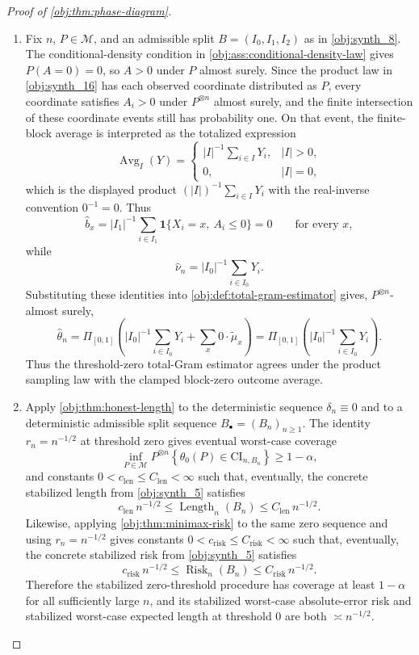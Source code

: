\begin{proof}[Proof of \cref{obj:thm:phase-diagram}]
\begin{enumerate}
\item Fix \(n\), \(P\in\mathcal M\), and an admissible split \(B=(I_0,I_1,I_2)\)
as in \cref{obj:synth_8}.  The conditional-density condition in
\cref{obj:ass:conditional-density-law} gives \(P(A=0)=0\), so \(A>0\) under \(P\)
almost surely.  Since the product law in
\cref{obj:synth_16} has each observed coordinate distributed as \(P\), every
coordinate satisfies \(A_i>0\) under \(P^{\otimes n}\) almost surely, and the
finite intersection of these coordinate events still has probability one.  On
that event, the finite-block average is interpreted as the totalized expression
\[
\operatorname{Avg}_I(Y)
=
\begin{cases}
|I|^{-1}\sum_{i\in I}Y_i,& |I|>0,\\
0,& |I|=0,
\end{cases}
\]
which is the displayed product \((|I|)^{-1}\sum_{i\in I}Y_i\) with the
real-inverse convention \(0^{-1}=0\).  Thus
\[
\widehat b_x
=
|I_1|^{-1}\sum_{i\in I_1}\mathbf 1\{X_i=x,\ A_i\le0\}
=
0
\qquad\text{for every }x,
\]
while
\[
\widehat\nu_n
=
|I_0|^{-1}\sum_{i\in I_0}Y_i .
\]
Substituting these identities into \cref{obj:def:total-gram-estimator} gives,
\(P^{\otimes n}\)-almost surely,
\[
\widehat\theta_n
=
\Pi_{[0,1]}
\left(
|I_0|^{-1}\sum_{i\in I_0}Y_i
+
\sum_x 0\cdot \widetilde\mu_x
\right)
=
\Pi_{[0,1]}
\left(
|I_0|^{-1}\sum_{i\in I_0}Y_i
\right).
\]
Thus the threshold-zero total-Gram estimator agrees under the product sampling
law with the clamped block-zero outcome average.

\item Apply \cref{obj:thm:honest-length} to the deterministic sequence
\(\delta_n\equiv0\) and to a deterministic admissible split sequence
\(B_\bullet=(B_n)_{n\ge1}\).  The identity \(r_n=n^{-1/2}\) at
threshold zero gives eventual worst-case coverage
\[
\inf_{P\in\mathcal M}
P^{\otimes n}\!
\left\{\theta_0(P)\in \mathrm{CI}_{n,B_n}\right\}
\ge 1-\alpha,
\]
and constants \(0<c_{\mathrm{len}}\le C_{\mathrm{len}}<\infty\) such that,
eventually, the concrete stabilized length from \cref{obj:synth_5} satisfies
\[
c_{\mathrm{len}}\,n^{-1/2}
\le
\operatorname{Length}_n(B_n)
\le
C_{\mathrm{len}}\,n^{-1/2}.
\]
Likewise, applying \cref{obj:thm:minimax-risk} to the same zero sequence and
using \(r_n=n^{-1/2}\) gives constants
\(0<c_{\mathrm{risk}}\le C_{\mathrm{risk}}<\infty\) such that, eventually, the
concrete stabilized risk from \cref{obj:synth_5} satisfies
\[
c_{\mathrm{risk}}\,n^{-1/2}
\le
\operatorname{Risk}_n(B_n)
\le
C_{\mathrm{risk}}\,n^{-1/2}.
\]
Therefore the stabilized zero-threshold procedure has coverage at least
\(1-\alpha\) for all sufficiently large \(n\), and its stabilized worst-case
absolute-error risk and stabilized worst-case expected length at threshold
\(0\) are both \(\asymp n^{-1/2}\).
\end{enumerate}
\end{proof}

